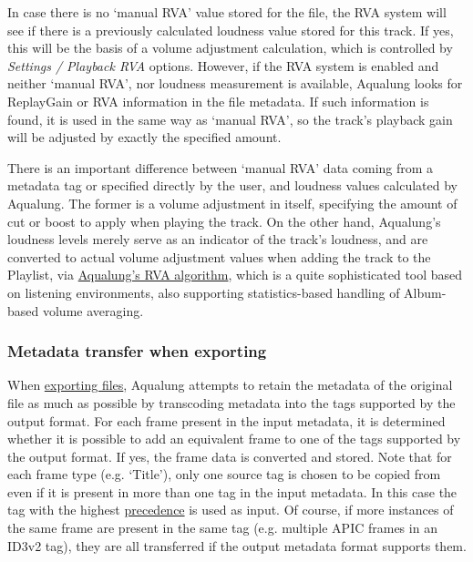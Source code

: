\documentclass[10pt,english]{article}
\begin{document}
In case there is no `manual RVA' value stored for
the file, the RVA system will see if there is a previously
calculated loudness value stored for this track. If yes,
this will be the basis of a volume adjustment calculation,
which is controlled by \textsl{Settings / Playback RVA}
options. However, if the RVA system is enabled and neither
`manual RVA', nor loudness measurement is available,
Aqualung looks for ReplayGain or RVA information in the file
metadata. If such information is found, it is used in the
same way as `manual RVA', so the track's playback gain
will be adjusted by exactly the specified amount.




There is an important difference between `manual
RVA' data coming from a metadata tag or specified
directly by the user, and loudness values calculated by
Aqualung. The former is a volume adjustment in itself,
specifying the amount of cut or boost to apply when playing
the track. On the other hand, Aqualung's loudness levels
merely serve as an indicator of the track's loudness, and
are converted to actual volume adjustment values when adding
the track to the Playlist, via \hyperref[idp645824]{\color{blue}Aqualung's
RVA algorithm}, which is a quite sophisticated tool
based on listening environments, also supporting
statistics-based handling of Album-based volume
averaging.




\subsubsection{Metadata transfer when exporting\label{idp737408}}



\noindent When \hyperref[idp623952]{\color{blue}exporting files},
Aqualung attempts to retain the metadata of the original
file as much as possible by transcoding metadata into the
tags supported by the output format. For each frame present
in the input metadata, it is determined whether it is
possible to add an equivalent frame to one of the tags
supported by the output format. If yes, the frame data is
converted and stored. Note that for each frame type
(e.g. `Title'), only one source tag is chosen to be
copied from even if it is present in more than one tag in
the input metadata. In this case the tag with the highest
\hyperref[idp713952]{\color{blue}precedence} is used as
input. Of course, if more instances of the same frame are
present in the same tag (e.g. multiple APIC frames in an
ID3v2 tag), they are all transferred if the output metadata
format supports them.
\end{document}
